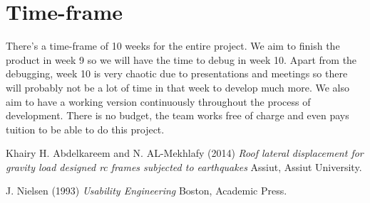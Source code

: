 \documentclass[a4paper]{article}
\begin{document}
\section{Time-frame}
There's a time-frame of 10 weeks for the entire project. We aim to finish the product in week 9 so we will have the time to debug in week 10. Apart from the debugging, week 10 is very chaotic due to presentations and meetings so there will probably not be a lot of time in that week to develop much more. We also aim to have a working version continuously throughout the process of development. There is no budget, the team works free of charge and even pays tuition to be able to do this project.

\begin{thebibliography}{9}
Khairy H. Abdelkareem and N. AL-Mekhlafy (2014)
\textit{Roof lateral displacement for gravity load designed rc frames subjected to earthquakes} Assiut, Assiut University.

J. Nielsen (1993) 
\textit{Usability Engineering}
Boston, Academic Press.
\end{thebibliography}
\end{document}
